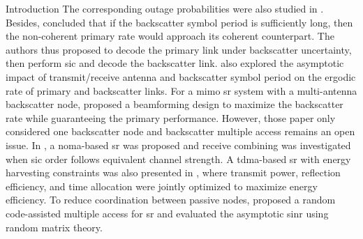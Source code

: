 \documentclass[journal]{IEEEtran}
\begin{document}
\begin{section}{Introduction}
	The corresponding outage probabilities were also studied in \cite{Ding2020}.
	Besides, \cite{Long2020a} concluded that if the backscatter symbol period is sufficiently long, then the non-coherent primary rate would approach its coherent counterpart.
	The authors thus proposed to decode the primary link under backscatter uncertainty, then perform \gls{sic} and decode the backscatter link.
	\cite{Zhou2019a} also explored the asymptotic impact of transmit/receive antenna and backscatter symbol period on the ergodic rate of primary and backscatter links.
	For a \gls{mimo} \gls{sr} system with a multi-antenna backscatter node, \cite{Wu2021a} proposed a beamforming design to maximize the backscatter rate while guaranteeing the primary performance.
	However, those paper only considered one backscatter node and backscatter multiple access remains an open issue.
	In \cite{Xu2021a}, a \gls{noma}-based \gls{sr} was proposed and receive combining was investigated when \gls{sic} order follows equivalent channel strength.
	A \gls{tdma}-based \gls{sr} with energy harvesting constraints was also presented in \cite{Yang2021a}, where transmit power, reflection efficiency, and time allocation were jointly optimized to maximize energy efficiency.
	To reduce coordination between passive nodes, \cite{Han2021} proposed a random code-assisted multiple access for \gls{sr} and evaluated the asymptotic \gls{sinr} using random matrix theory.


\end{section}
\end{document}
